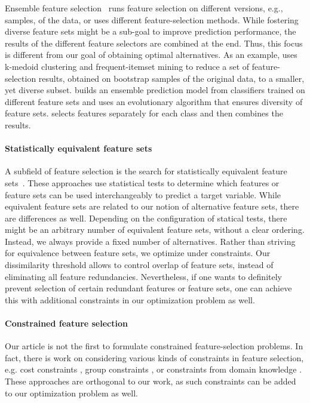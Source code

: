 \documentclass[conference]{IEEEtran}
\theoremstyle{definition}
\begin{document}
Ensemble feature selection~\cite{saeys2008robust, seijo2017ensemble} runs feature selection on different versions, e.g., samples, of the data, or uses different feature-selection methods.
While fostering diverse feature sets might be a sub-goal to improve prediction performance, the results of the different feature selectors are combined at the end.
Thus, this focus is different from our goal of obtaining optimal alternatives.
As an example, \cite{woznica2012model} uses k-medoid clustering and frequent-itemset mining to reduce a set of feature-selection results, obtained on bootstrap samples of the original data, to a smaller, yet diverse subset.
\cite{liu2019subspace} builds an ensemble prediction model from classifiers trained on different feature sets and uses an evolutionary algorithm that ensures diversity of feature sets.
\cite{guru2018alternative} selects features separately for each class and then combines the results.

\paragraph{Statistically equivalent feature sets}

A subfield of feature selection is the search for statistically equivalent feature sets~\cite{lagani2017feature, borboudakis2021extending}.
These approaches use statistical tests to determine which features or feature sets can be used interchangeably to predict a target variable.
While equivalent feature sets are related to our notion of alternative feature sets, there are differences as well.
Depending on the configuration of statical tests, there might be an arbitrary number of equivalent feature sets, without a clear ordering.
Instead, we always provide a fixed number of alternatives.
Rather than striving for equivalence between feature sets, we optimize under constraints.
Our dissimilarity threshold allows to control overlap of feature sets, instead of eliminating all feature redundancies.
Nevertheless, if one wants to definitely prevent selection of certain redundant features or feature sets, one can achieve this with additional constraints in our optimization problem as well.

\paragraph{Constrained feature selection}

Our article is not the first to formulate constrained feature-selection problems.
In fact, there is work on considering various kinds of constraints in feature selection, e.g. cost constraints \cite{paclik2002feature}, group constraints \cite{yuan2006model}, or constraints from domain knowledge \cite{groves2015toward}.
These approaches are orthogonal to our work, as such constraints can be added to our optimization problem as well.
\end{document}
